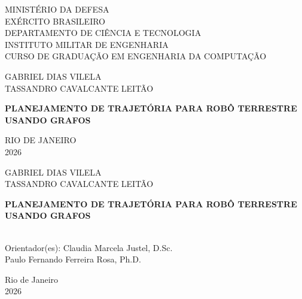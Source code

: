 \documentclass[
    12pt,
    openright,
    oneside,
    a4paper,
    english,
    brazil
]{abntex2}
\begin{document}
\frenchspacing

\pretextual

\begin{capa}
    \center
    \ABNTEXchapterfont

    {\normalsize
    MINISTÉRIO DA DEFESA\\
    EXÉRCITO BRASILEIRO\\
    DEPARTAMENTO DE CIÊNCIA E TECNOLOGIA\\
    INSTITUTO MILITAR DE ENGENHARIA\\
    CURSO DE GRADUAÇÃO EM ENGENHARIA DA COMPUTAÇÃO}

    \vspace*{2cm}

    {\large GABRIEL DIAS VILELA}\\
    {\large TASSANDRO CAVALCANTE LEITÃO}

    \vspace*{3cm}

    {\Large\bfseries PLANEJAMENTO DE TRAJETÓRIA PARA ROBÔ TERRESTRE USANDO GRAFOS}

    \vfill

    {\large RIO DE JANEIRO}\\
    {\large 2026}
\end{capa}

\begin{folhaderosto}
    \center
    {\large GABRIEL DIAS VILELA}\\
    {\large TASSANDRO CAVALCANTE LEITÃO}

    \vspace*{3cm}

    {\Large\bfseries PLANEJAMENTO DE TRAJETÓRIA PARA ROBÔ TERRESTRE USANDO GRAFOS}

    \vspace*{2cm}

    \hspace{.45\textwidth}
    \begin{minipage}{.5\textwidth}
        \imprimirpreambulo\\[1em]
        Orientador(es): Claudia Marcela Justel, D.Sc.\\
        Paulo Fernando Ferreira Rosa, Ph.D.
    \end{minipage}

    \vfill

    {\large Rio de Janeiro}\\
    {\large 2026}
\end{folhaderosto}
\end{document}
